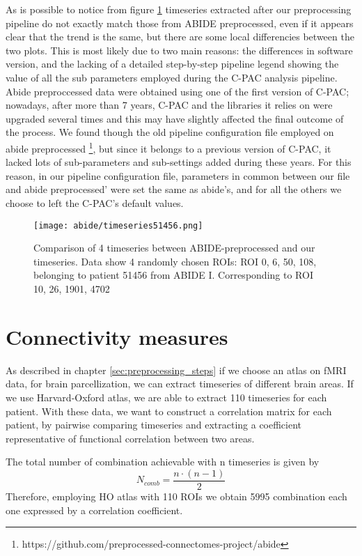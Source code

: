 \documentclass[10pt]{report}
\begin{document}
As is possible to notice from figure \ref{fig:confrontoabidepreproc} timeseries extracted after our preprocessing pipeline do not exactly match those from ABIDE preprocessed, even if it appears clear that the trend is the same, but there are some local differencies between the two plots.
This is most likely due to two main reasons: the differences in software version, and the lacking of a detailed step-by-step pipeline legend showing the value of all the sub parameters employed during the C-PAC analysis pipeline.
Abide preproccessed data were obtained using one of the first version of C-PAC; nowadays, after more than 7 years, C-PAC and the libraries it relies on were upgraded several times and this may have slightly affected the final outcome of the process.
We found though the old pipeline configuration file employed on abide preprocessed \footnote{https://github.com/preprocessed-connectomes-project/abide}, but since it belongs to a previous version of C-PAC, it lacked lots of sub-parameters and sub-settings added during these years.
For this reason, in our pipeline configuration file, parameters in common between our file and abide preprocessed' were set the same as abide's, and for all the others we choose to left the C-PAC's default values.

\begin{figure}[h]
\centering
\texttt{[image: abide/timeseries51456.png]}
\caption{Comparison of 4 timeseries between ABIDE-preprocessed and our timeseries. Data show 4 randomly chosen ROIs: ROI 0, 6, 50, 108, belonging to patient 51456 from ABIDE I. Corresponding to ROI 10, 26, 1901, 4702}
\label{fig:confrontoabidepreproc}
\end{figure}




\chapter{Connectivity measures}
As described in chapter \ref{sec:preprocessing_steps} if we choose an atlas on fMRI data, for brain parcellization, we can extract timeseries of different brain areas. If we use Harvard-Oxford atlas, we are able to extract 110 timeseries for each patient.
With these data, we want to construct a correlation matrix for each patient, by pairwise comparing timeseries and extracting a coefficient representative of functional correlation between two areas.

The total number of combination achievable with n timeseries is given by
\begin{equation}
N_{comb} = \frac{n\cdot(n-1)}{2}
\end{equation}
Therefore, employing HO atlas with 110 ROIs we obtain 5995 combination each one expressed by a correlation coefficient.
\end{document}

